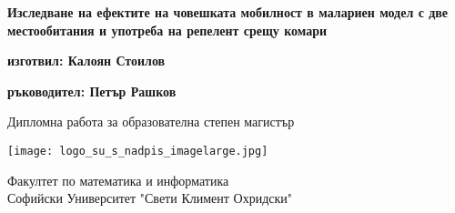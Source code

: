 \begin{titlepage}
  \begin{center}
    \vspace*{1cm}

    \Huge
    \textbf{Изследване на ефектите на човешката мобилност в малариен модел с две местообитания и употреба на репелент срещу комари}


    \vspace{1.5cm}

    \textbf{изготвил: Калоян Стоилов}

    \vspace{0.8cm}

    \textbf{ръководител: Петър Рашков}

    \vfill

    Дипломна работа за образователна степен магистър

    \vspace{0.8cm}

    \texttt{[image: logo\_su\_s\_nadpis\_imagelarge.jpg]}

    \Large
    Факултет по математика и информатика\\
    Софийски Университет "Свети Климент Охридски"\\

  \end{center}
\end{titlepage}
